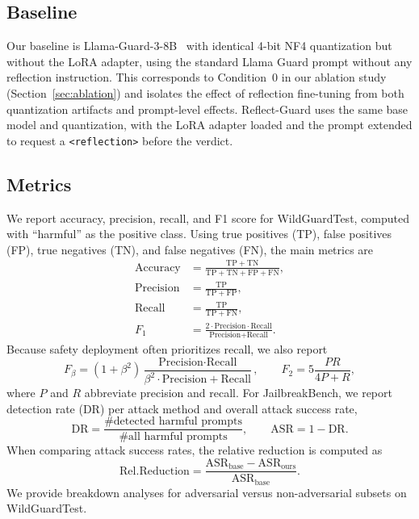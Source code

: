 \documentclass[11pt]{article}
\begin{document}
\subsection{Baseline}

Our baseline is Llama-Guard-3-8B~\citep{metallamaguard3} with identical 4-bit NF4 quantization but without the LoRA adapter, using the standard Llama Guard prompt without any reflection instruction. This corresponds to Condition~0 in our ablation study (Section~\ref{sec:ablation}) and isolates the effect of reflection fine-tuning from both quantization artifacts and prompt-level effects. Reflect-Guard uses the same base model and quantization, with the LoRA adapter loaded and the prompt extended to request a \texttt{<reflection>} before the verdict.

\subsection{Metrics}

We report accuracy, precision, recall, and F1 score for WildGuardTest, computed with ``harmful'' as the positive class. Using true positives (TP), false positives (FP), true negatives (TN), and false negatives (FN), the main metrics are
\begin{align}
  \text{Accuracy} &= \frac{\mathrm{TP}+\mathrm{TN}}{\mathrm{TP}+\mathrm{TN}+\mathrm{FP}+\mathrm{FN}}, \\
  \text{Precision} &= \frac{\mathrm{TP}}{\mathrm{TP}+\mathrm{FP}}, \\
  \text{Recall} &= \frac{\mathrm{TP}}{\mathrm{TP}+\mathrm{FN}}, \\
  F_{1} &= \frac{2 \cdot \text{Precision} \cdot \text{Recall}}{\text{Precision}+\text{Recall}}.
\end{align}
Because safety deployment often prioritizes recall, we also report
\begin{equation}
  F_{\beta} = (1+\beta^2)\frac{\text{Precision} \cdot \text{Recall}}{\beta^2 \cdot \text{Precision} + \text{Recall}},
  \qquad F_2 = 5\frac{PR}{4P + R},
\end{equation}
where $P$ and $R$ abbreviate precision and recall. For JailbreakBench, we report detection rate (DR) per attack method and overall attack success rate,
\begin{equation}
  \mathrm{DR} = \frac{\#\text{detected harmful prompts}}{\#\text{all harmful prompts}},
  \qquad
  \mathrm{ASR} = 1 - \mathrm{DR}.
\end{equation}
When comparing attack success rates, the relative reduction is computed as
\begin{equation}
  \mathrm{Rel.Reduction} = \frac{\mathrm{ASR}_{\text{base}} - \mathrm{ASR}_{\text{ours}}}{\mathrm{ASR}_{\text{base}}}.
\end{equation}
We provide breakdown analyses for adversarial versus non-adversarial subsets on WildGuardTest.
\end{document}

